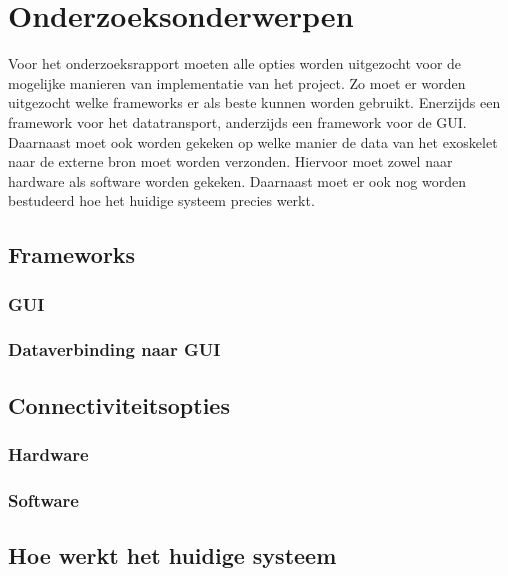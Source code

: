 \section{Onderzoeksonderwerpen}
Voor het onderzoeksrapport moeten alle opties worden uitgezocht voor de mogelijke manieren van implementatie van het project. Zo moet er worden uitgezocht welke frameworks er als beste kunnen worden gebruikt. Enerzijds een framework voor het datatransport, anderzijds een framework voor de GUI. Daarnaast moet ook worden gekeken op welke manier de data van het exoskelet naar de externe bron moet worden verzonden. Hiervoor moet zowel naar hardware als software worden gekeken. Daarnaast moet er ook nog worden bestudeerd hoe het huidige systeem precies werkt. 
\subsection{Frameworks}
\subsubsection{GUI}
\subsubsection{Dataverbinding naar GUI}
\subsection{Connectiviteitsopties}
\subsubsection{Hardware}
\subsubsection{Software}
\subsection{Hoe werkt het huidige systeem}